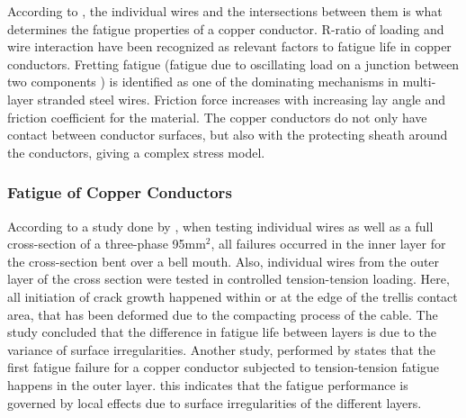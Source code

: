 \noindent According to \cite{Karlsen2010}, the individual wires and the intersections between them is what determines the fatigue properties of a copper conductor. R-ratio of loading and wire interaction have been recognized as relevant factors to fatigue life in copper conductors. Fretting fatigue (fatigue due to oscillating load on a junction between two components \cite{Hills1994}) is identified as one of the dominating mechanisms in multi-layer stranded steel wires. Friction force increases with increasing lay angle and friction coefficient for the material. The copper conductors do not only have contact between conductor surfaces, but also with the protecting sheath around the conductors, giving a complex stress model.

\subsubsection{Fatigue of Copper Conductors}
\label{sec:fatcop}
According to a study done by \cite{Nasution2013}, when testing individual wires as well as a full cross-section of a three-phase 95mm$^2$, all failures occurred in the inner layer for the cross-section bent over a bell mouth. Also, individual wires from the outer layer of the cross section were tested in controlled tension-tension loading. Here, all initiation of crack growth happened within or at the edge of the trellis contact area, that has been deformed due to the compacting process of the cable. The study concluded that the difference in fatigue life between layers is due to the variance of surface irregularities. Another study, performed by \cite{NASUTION2014} states that the first fatigue failure for a copper conductor subjected to tension-tension fatigue happens in the outer layer. this indicates that the fatigue performance is governed by local effects due to surface irregularities of the different layers. \newline
\newline
